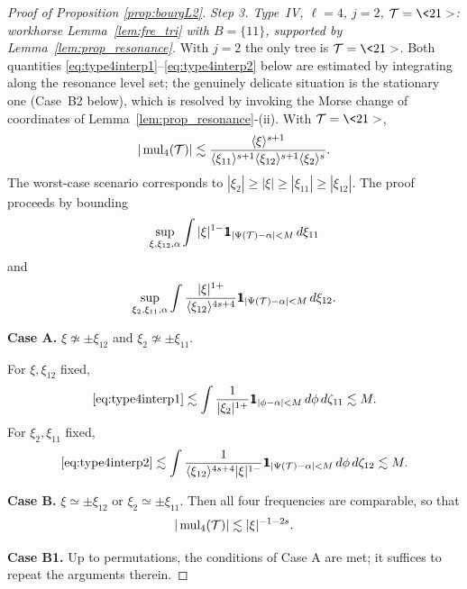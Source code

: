 \begin{proof}[Proof of Proposition \ref{prop:bourgL2}]
\medskip

\noi \textit{Step 3. Type~IV, $\ell=4$, $j=2$, $\TT=\<21>$: workhorse Lemma~\ref{lem:fre_tri} with $B=\{11\}$, supported by Lemma~\ref{lem:prop_resonance}.}
With $j=2$ the only tree is $\TT=\<21>$. Both quantities \eqref{eq:type4interp1}--\eqref{eq:type4interp2} below are estimated by integrating along the resonance level set; the genuinely delicate situation is the stationary one (Case~B2 below), which is resolved by invoking the Morse change of coordinates of Lemma~\ref{lem:prop_resonance}-(ii).
With $\TT=\<21>$,
\begin{equation}
\label{typeIVmult2}
|\operatorname{mul}_4(\mathcal{T})|\lesssim \frac{\langle \xi \rangle^{s+1}}{\langle \xi_{11} \rangle^{s+1}\langle \xi_{12} \rangle^{s+1}\langle \xi_2 \rangle^s}.
\end{equation}
The worst-case scenario corresponds to $|\xi_2|\ge |\xi|\ge |\xi_{11}|\ge |\xi_{12}|$. The proof proceeds by bounding
\begin{equation}\label{eq:type4interp1}
\sup_{\xi,\xi_{12},\alpha} \int |\xi|^{1-} \ind_{|\Psi(\TT)-\alpha|<M}\,d\xi_{11}
\end{equation}
and
\begin{equation}\label{eq:type4interp2}
\sup_{\xi_2,\xi_{11},\alpha} \int \frac{|\xi|^{1+}}{\jap{\xi_{12}}^{4s+4}}\ind_{|\Psi(\TT)-\alpha|<M}\,d\xi_{12}.
\end{equation}

\smallskip
\noi\textbf{Case A.} $\xi\not\simeq \pm \xi_{12}$ and $\xi_2\not\simeq \pm \xi_{11}$.

\noi For $\xi, \xi_{12}$ fixed,
\begin{equation}\label{eq:typeIVest1}
\eqref{eq:type4interp1}\lesssim \int \frac{1}{|\xi_2|^{1+}}\ind_{|\phi-\alpha|<M}\,d\phi\, d\zeta_{11} \lesssim M.
\end{equation}
For $\xi_2, \xi_{11}$ fixed,
\begin{equation}\label{eq:typeIVest2}
\eqref{eq:type4interp2} \lesssim \int \frac{1}{\jap{\xi_{12}}^{4s+4}|\xi|^{1-}}\ind_{|\Psi(\TT)-\alpha|<M}\,d\phi\, d\zeta_{12} \lesssim M.
\end{equation}

\smallskip
\noi
\textbf{Case B.} $\xi\simeq \pm \xi_{12}$ or $\xi_2\simeq \pm \xi_{11}$. Then all four frequencies are comparable, so that
$$
|\operatorname{mul}_4(\mathcal{T})|\lesssim |\xi|^{-1-2s}.
$$

\smallskip
\noi
\textbf{Case B1.} Up to permutations, the conditions of Case A are met; it suffices to repeat the arguments therein.


\end{proof}
